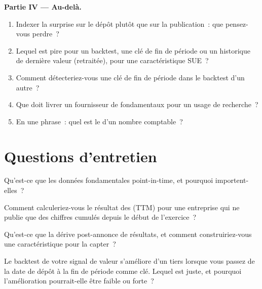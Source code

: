 \begin{problem}
\medskip\noindent\textbf{Partie IV --- Au-delà.}
\begin{enumerate}[resume]
\item Indexer la surprise sur le dépôt plutôt que sur la publication~: que pensez-vous perdre~?
\item Lequel est pire pour un backtest, une clé de fin de période ou un historique de dernière valeur (retraitée), pour une caractéristique SUE~?
\item Comment détecteriez-vous une clé de fin de période dans le backtest d'un autre~?
\item Que doit livrer un fournisseur de fondamentaux pour un usage de recherche~?
\item En une phrase~: quel est le  d'un nombre comptable~?
\end{enumerate}
\end{problem}

\section{Questions d'entretien}

\begin{interviewq}\label{iq:rs:fundamental-analyst-and-event-features:1}
Qu'est-ce que les données fondamentales point-in-time, et pourquoi importent-elles~?
\end{interviewq}

\begin{interviewq}\label{iq:rs:fundamental-analyst-and-event-features:2}
Comment calculeriez-vous le résultat des  (TTM) pour une entreprise qui ne publie que des chiffres cumulés depuis le début de l'exercice~?
\end{interviewq}

\begin{interviewq}\label{iq:rs:fundamental-analyst-and-event-features:3}
Qu'est-ce que la dérive post-annonce de résultats, et comment construiriez-vous une caractéristique pour la capter~?
\end{interviewq}

\begin{interviewq}\label{iq:rs:fundamental-analyst-and-event-features:4}
Le backtest de votre signal de valeur s'améliore d'un tiers lorsque vous passez de la date de dépôt à la fin de période comme clé. Lequel est juste, et
pourquoi l'amélioration pourrait-elle être faible ou forte~?
\end{interviewq}

